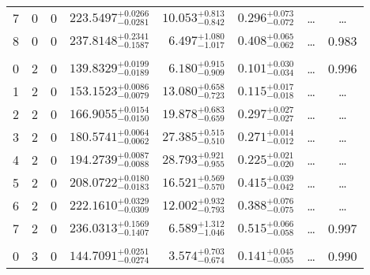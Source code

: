 \begin{table*}[!]
\begin{tabular}{llcrrlrc}
7 & 0 & 0 & $    223.5497_{-      0.0281}^{+      0.0266}$ & $      10.053_{-       0.842}^{+       0.813}$ & $       0.296_{-       0.072}^{+       0.073}$ & \multicolumn{1}{c}{\dots} & \dots \\[1pt]
8 & 0 & 0 & $    237.8148_{-      0.1587}^{+      0.2341}$ & $       6.497_{-       1.017}^{+       1.080}$ & $       0.408_{-       0.062}^{+       0.065}$ & \multicolumn{1}{c}{\dots} & 0.983\\[1pt]
\hline \\[-8pt]
0 & 2 & 0 & $    139.8329_{-      0.0189}^{+      0.0199}$ & $       6.180_{-       0.909}^{+       0.915}$ & $       0.101_{-       0.034}^{+       0.030}$ & \multicolumn{1}{c}{\dots} & 0.996\\[1pt]
1 & 2 & 0 & $    153.1523_{-      0.0079}^{+      0.0086}$ & $      13.080_{-       0.723}^{+       0.658}$ & $       0.115_{-       0.018}^{+       0.017}$ & \multicolumn{1}{c}{\dots} & \dots \\[1pt]
2 & 2 & 0 & $    166.9055_{-      0.0150}^{+      0.0154}$ & $      19.878_{-       0.659}^{+       0.683}$ & $       0.297_{-       0.027}^{+       0.027}$ & \multicolumn{1}{c}{\dots} & \dots \\[1pt]
3 & 2 & 0 & $    180.5741_{-      0.0062}^{+      0.0064}$ & $      27.385_{-       0.510}^{+       0.515}$ & $       0.271_{-       0.012}^{+       0.014}$ & \multicolumn{1}{c}{\dots} & \dots \\[1pt]
4 & 2 & 0 & $    194.2739_{-      0.0088}^{+      0.0087}$ & $      28.793_{-       0.955}^{+       0.921}$ & $       0.225_{-       0.020}^{+       0.021}$ & \multicolumn{1}{c}{\dots} & \dots \\[1pt]
5 & 2 & 0 & $    208.0722_{-      0.0183}^{+      0.0180}$ & $      16.521_{-       0.570}^{+       0.569}$ & $       0.415_{-       0.042}^{+       0.039}$ & \multicolumn{1}{c}{\dots} & \dots \\[1pt]
6 & 2 & 0 & $    222.1610_{-      0.0309}^{+      0.0329}$ & $      12.002_{-       0.793}^{+       0.932}$ & $       0.388_{-       0.075}^{+       0.076}$ & \multicolumn{1}{c}{\dots} & \dots \\[1pt]
7 & 2 & 0 & $    236.0313_{-      0.1407}^{+      0.1569}$ & $       6.589_{-       1.046}^{+       1.312}$ & $       0.515_{-       0.058}^{+       0.066}$ & \multicolumn{1}{c}{\dots} & 0.997\\[1pt]
\hline \\[-8pt]
0 & 3 & 0 & $    144.7091_{-      0.0274}^{+      0.0251}$ & $       3.574_{-       0.674}^{+       0.703}$ & $       0.141_{-       0.055}^{+       0.045}$ & \multicolumn{1}{c}{\dots} & 0.990\\[1pt]

\end{tabular}
\end{table*}
